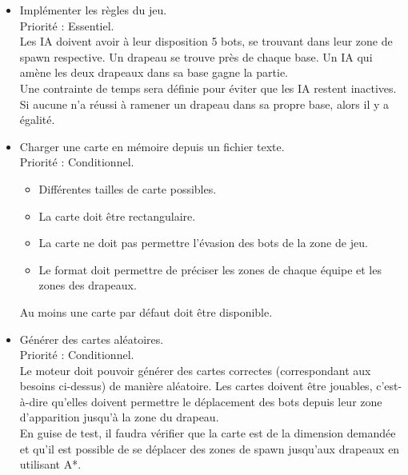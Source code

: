     \begin{itemize}
        
        \item Implémenter les règles du jeu. \\
                Priorité : Essentiel.\\
                Les IA doivent avoir à leur disposition 5 bots, se trouvant dans leur zone de spawn respective. Un drapeau se trouve près de chaque base. Un IA qui amène les deux drapeaux dans sa base gagne la partie.\\
                Une contrainte de temps sera définie pour éviter que les IA restent inactives. Si aucune n'a réussi à ramener un drapeau dans sa propre base, alors il y a égalité.\\
                
        \item Charger une carte en mémoire depuis un fichier texte. \\
                Priorité : Conditionnel.
                \begin{itemize}
                    \item Différentes tailles de carte possibles.
                    \item La carte doit être rectangulaire.
                    \item La carte ne doit pas permettre l'évasion des bots de la zone de jeu.
                    \item Le format doit permettre de préciser les zones de chaque équipe et les zones des drapeaux.
                \end{itemize}
                Au moins une carte par défaut doit être disponible. \\
                
        \item Générer des cartes aléatoires.\\
            Priorité : Conditionnel.\\
            Le moteur doit pouvoir générer des cartes correctes (correspondant aux besoins ci-dessus) de manière aléatoire. Les cartes doivent être jouables, c'est-à-dire qu'elles doivent permettre le déplacement des bots depuis leur zone d'apparition jusqu'à la zone du drapeau.\\
            En guise de test, il faudra vérifier que la carte est de la dimension demandée et qu'il est possible de se déplacer des zones de spawn jusqu'aux drapeaux en utilisant A*.\\


\end{itemize}

